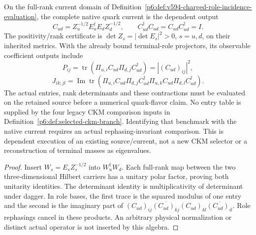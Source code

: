 \documentclass[12pt,a4paper]{article}
\begin{document}
\begin{proposition}
\label{p6:prop:v2211-quark-current-output-certificate}
On the full-rank current domain of
Definition~\ref{p6:def:v594-charged-role-incidence-evaluation}, the complete
native quark current is the dependent output
\[
 \boxed{C_{ud}=Z_u^{-1/2}E_u^\dagger E_dZ_d^{-1/2},\qquad
 C_{ud}^\dagger C_{ud}=C_{ud}C_{ud}^\dagger=I.}
\]
The positivity/rank certificate is
\(\det Z_s=|\det E_s|^2>0\), \(s=u,d\), on their inherited metrics.
With the already bound terminal-role projectors, its observable coefficient
outputs include
\[
 P_{ij}=\operatorname{tr}
 (\Pi_{u,i}C_{ud}\Pi_{d,j}C_{ud}^\dagger)=|(C_{ud})_{ij}|^2,
\]
\[
 J_{ik;jl}=\operatorname{Im}\operatorname{tr}
 (\Pi_{u,i}C_{ud}\Pi_{d,j}C_{ud}^\dagger
  \Pi_{u,k}C_{ud}\Pi_{d,l}C_{ud}^\dagger).
\]
The actual entries, rank determinants and these contractions must be
evaluated on the retained source before a numerical quark-flavor claim.
No entry table is supplied by the four legacy CKM comparison inputs in
Definition~\ref{p6:def:selected-ckm-branch}.  Identifying that benchmark
with the native current requires an actual rephasing-invariant comparison.
This is dependent execution of an existing source/current, not a new CKM
selector or a reconstruction of terminal masses as eigenvalues.
\end{proposition}
\begin{proof}
Insert \(W_s=E_sZ_s^{-1/2}\) into \(W_u^\dagger W_d\).
Each full-rank map between the two three-dimensional Hilbert carriers has
a unitary polar factor, proving both unitarity identities.  The determinant
identity is multiplicativity of determinant under dagger.  In role bases,
the first trace is the squared modulus of one entry and the second is the
imaginary part of
\((C_{ud})_{ij}\overline{(C_{ud})_{kj}}
 (C_{ud})_{kl}\overline{(C_{ud})_{il}}\).
Role rephasings cancel in these products.  An arbitrary physical
normalization or distinct actual operator is not inserted by this algebra.
\end{proof}
\end{document}
